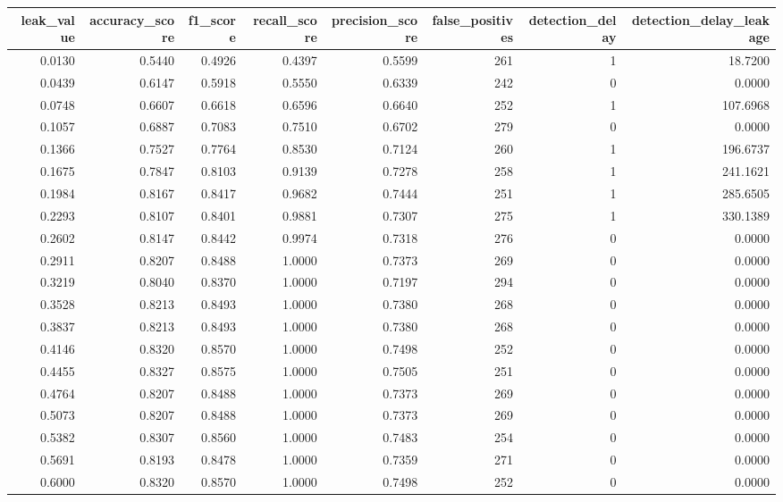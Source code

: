 \begin{tabular}{rrrrrrrr}
\toprule
leak\_value & accuracy\_score & f1\_score & recall\_score & precision\_score & false\_positives & detection\_delay & detection\_delay\_leakage \\
\midrule
0.0130 & 0.5440 & 0.4926 & 0.4397 & 0.5599 & 261 & 1 & 18.7200 \\
0.0439 & 0.6147 & 0.5918 & 0.5550 & 0.6339 & 242 & 0 & 0.0000 \\
0.0748 & 0.6607 & 0.6618 & 0.6596 & 0.6640 & 252 & 1 & 107.6968 \\
0.1057 & 0.6887 & 0.7083 & 0.7510 & 0.6702 & 279 & 0 & 0.0000 \\
0.1366 & 0.7527 & 0.7764 & 0.8530 & 0.7124 & 260 & 1 & 196.6737 \\
0.1675 & 0.7847 & 0.8103 & 0.9139 & 0.7278 & 258 & 1 & 241.1621 \\
0.1984 & 0.8167 & 0.8417 & 0.9682 & 0.7444 & 251 & 1 & 285.6505 \\
0.2293 & 0.8107 & 0.8401 & 0.9881 & 0.7307 & 275 & 1 & 330.1389 \\
0.2602 & 0.8147 & 0.8442 & 0.9974 & 0.7318 & 276 & 0 & 0.0000 \\
0.2911 & 0.8207 & 0.8488 & 1.0000 & 0.7373 & 269 & 0 & 0.0000 \\
0.3219 & 0.8040 & 0.8370 & 1.0000 & 0.7197 & 294 & 0 & 0.0000 \\
0.3528 & 0.8213 & 0.8493 & 1.0000 & 0.7380 & 268 & 0 & 0.0000 \\
0.3837 & 0.8213 & 0.8493 & 1.0000 & 0.7380 & 268 & 0 & 0.0000 \\
0.4146 & 0.8320 & 0.8570 & 1.0000 & 0.7498 & 252 & 0 & 0.0000 \\
0.4455 & 0.8327 & 0.8575 & 1.0000 & 0.7505 & 251 & 0 & 0.0000 \\
0.4764 & 0.8207 & 0.8488 & 1.0000 & 0.7373 & 269 & 0 & 0.0000 \\
0.5073 & 0.8207 & 0.8488 & 1.0000 & 0.7373 & 269 & 0 & 0.0000 \\
0.5382 & 0.8307 & 0.8560 & 1.0000 & 0.7483 & 254 & 0 & 0.0000 \\
0.5691 & 0.8193 & 0.8478 & 1.0000 & 0.7359 & 271 & 0 & 0.0000 \\
0.6000 & 0.8320 & 0.8570 & 1.0000 & 0.7498 & 252 & 0 & 0.0000 \\
\bottomrule
\end{tabular}
